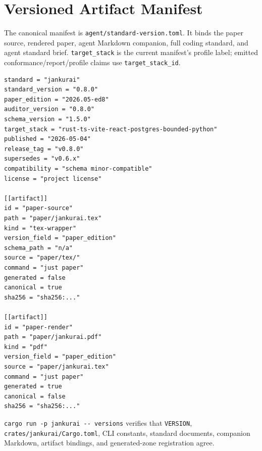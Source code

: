 \section{Versioned Artifact Manifest}

The canonical manifest is \texttt{agent/standard-version.toml}. It binds the paper source, rendered paper, agent Markdown companion, full coding standard, and agent standard brief. \texttt{target\_stack} is the current manifest's profile label; emitted conformance/report/profile claims use \texttt{target\_stack\_id}.

\begin{lstlisting}[style=codebox]
standard = "jankurai"
standard_version = "0.8.0"
paper_edition = "2026.05-ed8"
auditor_version = "0.8.0"
schema_version = "1.5.0"
target_stack = "rust-ts-vite-react-postgres-bounded-python"
published = "2026-05-04"
release_tag = "v0.8.0"
supersedes = "v0.6.x"
compatibility = "schema minor-compatible"
license = "project license"

[[artifact]]
id = "paper-source"
path = "paper/jankurai.tex"
kind = "tex-wrapper"
version_field = "paper_edition"
schema_path = "n/a"
source = "paper/tex/"
command = "just paper"
generated = false
canonical = true
sha256 = "sha256:..."

[[artifact]]
id = "paper-render"
path = "paper/jankurai.pdf"
kind = "pdf"
version_field = "paper_edition"
source = "paper/jankurai.tex"
command = "just paper"
generated = true
canonical = false
sha256 = "sha256:..."
\end{lstlisting}

\verb|cargo run -p jankurai -- versions| verifies that \texttt{VERSION}, \texttt{crates/jankurai/Cargo.toml}, CLI constants, standard documents, companion Markdown, artifact bindings, and generated-zone registration agree.
